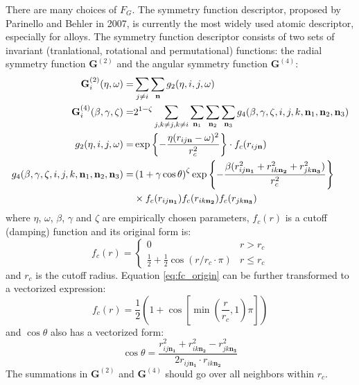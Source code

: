 \documentclass[preprint]{revtex4-2}
\begin{document}
\newcommand{\rijna}{r_{ij\mathbf{n_1}}}
\newcommand{\rikna}{r_{ik\mathbf{n_2}}}
\newcommand{\rjkna}{r_{jk\mathbf{n_3}}}

There are many choices of $F_G$. The symmetry function descriptor, proposed 
by Parinello and Behler in 2007\cite{Behler}, is currently the most widely used 
atomic descriptor, especially for alloys. The symmetry function descriptor 
consists of two sets of invariant (tranlational, rotational and permutational) 
functions: the radial symmetry function $\mathbf{G}^{(2)}$ and the angular 
symmetry function $\mathbf{G}^{(4)}$:
\begin{align}
\label{eq:G2}
\mathbf{G}^{(2)}_i(\eta, \omega) = & \sum_{j \neq i}{
    \sum_{\mathbf{n}}{g_2 (\eta, i, j, \omega)}
} \\
\label{eq:G4}
\mathbf{G}^{(4)}_i(\beta, \gamma, \zeta) 
= & 2^{1-\zeta}\sum_{j, k\neq j, k\neq i}{
    \sum_{\mathbf{n}_1}{\sum_{\mathbf{n}_2}{\sum_{\mathbf{n}_3}{
        g_4(\beta, \gamma, \zeta, 
          i, j, k, 
          \mathbf{n}_1, \mathbf{n}_2, \mathbf{n}_3)
    }}}
} \\
\label{eq:g2}
g_2(\eta, i, j, \omega) = 
& \exp\left\{-\frac{\eta(\rijn - \omega)^2}{r_c^2} \right\} \cdot f_c(\rijn) \\
\label{eq:g4}
g_4(
    \beta, \gamma, \zeta, 
    i, j, k, 
    \mathbf{n}_1, \mathbf{n}_2, \mathbf{n}_3) = & 
\left( 1 + \gamma\cos\theta \right)^\zeta 
    \exp \left\{ -\frac{\beta(\rijna^2 + \rikna^2 + \rjkna^2)}{r_c^2} \right\}
\nonumber \\
& \times f_c(\rijna)f_c(\rikna)f_c(\rjkna)
\end{align}
where $\eta$, $\omega$, $\beta$, $\gamma$ and $\zeta$ are empirically chosen 
parameters, $f_c(r)$ is a cutoff (damping) function and its original form is:
\begin{equation}
\label{eq:fc_origin}
f_c(r) =
    \begin{cases}
    0 & \text{$r > r_c$} \\
    \frac{1}{2} + \frac{1}{2}\cos\left(r / r_c \cdot \pi \right) & 
    \text{$r \leq r_c$}
    \end{cases}
\end{equation}
and $r_c$ is the cutoff radius. Equation \eqref{eq:fc_origin} can be further 
transformed to a vectorized expression:
\begin{equation}
\label{eq:fc}
f_c(r) = \frac{1}{2}\left( 
    1 + \cos\left[ \min(\frac{r}{r_c}, 1) \pi \right] 
\right)
\end{equation} 
and $\cos\theta$ also has a vectorized form:
\begin{equation}
\cos\theta = \frac{\rijna^2 + \rikna^2 - \rjkna^2}{2 \rijna \cdot \rikna}
\end{equation}
The summations in $\mathbf{G}^{(2)}$ and $\mathbf{G}^{(4)}$ should go over all 
neighbors within $r_c$. 
\end{document}

